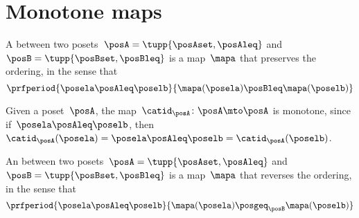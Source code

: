 
\section{Monotone maps}

\label{sec:monotonicity-monotone-maps}



\begin{definition}
    \label{def:monotone}
    A \emph{} between two posets~$\posA=\tupp{\posAset, \posAleq}$ and~$\posB=\tupp{\posBset, \posBleq}$ is a map~$\mapa$ that preserves the ordering, in the sense that
    \begin{equation}
        \prfperiod{
            \posela \posAleq \poselb
        }{
            \mapa(\posela) \posBleq \mapa(\poselb)
        }
    \end{equation}
\end{definition}

\begin{remark}
    Given a poset~$\posA$, the map~$\catid_{\posA}\colon \posA \mto \posA$ is monotone, since if~$\posela\posAleq \poselb$, then~$\catid_{\posA}(\posela)=\posela \posAleq  \poselb =  \catid_{\posA}(\poselb )$.
\end{remark}

\begin{definition}
    \label{def:antitone}
    An \emph{} between two posets~$\posA=\tupp{\posAset, \posAleq}$ and~$\posB=\tupp{\posBset, \posBleq}$ is a map~$\mapa$ that reverses the ordering, in the sense that
    \begin{equation}
        \prfperiod{
            \posela \posAleq \poselb
        }{
            \mapa(\posela) \posgeq_\posB \mapa(\poselb)
        }
    \end{equation}
\end{definition}

